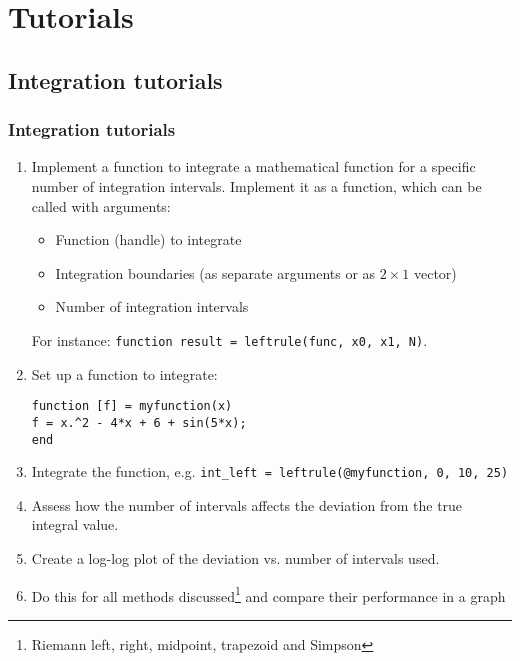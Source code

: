 \section{Tutorials}
\subsection*{Integration tutorials}
\begin{frame}[fragile]
  \frametitle{Integration tutorials}
  \begin{enumerate}
    \item Implement a function to integrate a mathematical function for a specific number of integration intervals. Implement it as a function, which can be called with arguments:
    \begin{itemize}
      \item Function (handle) to integrate
      \item Integration boundaries (as separate arguments or as $2 \times 1$ vector)
      \item Number of integration intervals
    \end{itemize}
    For instance: \lstinline$function result = leftrule(func, x0, x1, N)$.\\
    \item Set up a function to integrate:
    \begin{lstlisting}
function [f] = myfunction(x)
f = x.^2 - 4*x + 6 + sin(5*x);
end
    \end{lstlisting}
    \item Integrate the function, e.g. \lstinline$int_left = leftrule(@myfunction, 0, 10, 25)$
    \item Assess how the number of intervals affects the deviation from the true integral value. 
    \item Create a log-log plot of the deviation vs. number of intervals used.
    \item Do this for all methods discussed\footnote{Riemann left, right, midpoint, trapezoid and Simpson} and compare their performance in a graph
  \end{enumerate}
 \end{frame}